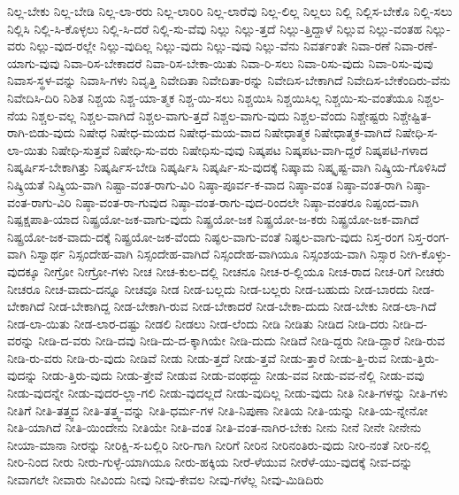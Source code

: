 {ನಿಲ್ಲ-ಬೇಕು
ನಿಲ್ಲ-ಬೇಡಿ
ನಿಲ್ಲ-ಲಾ-ರರು
ನಿಲ್ಲ-ಲಾರಿರಿ
ನಿಲ್ಲ-ಲಾರೆವು
ನಿಲ್ಲ-ಲಿಲ್ಲ
ನಿಲ್ಲಲು
ನಿಲ್ಲಿ
ನಿಲ್ಲಿಸ-ಬೇಕೊ
ನಿಲ್ಲಿ-ಸಲು
ನಿಲ್ಲಿಸಿ
ನಿಲ್ಲಿ-ಸಿ-ಕೊಳ್ಳಲು
ನಿಲ್ಲಿ-ಸಿ-ದರೆ
ನಿಲ್ಲಿ-ಸು-ವೆವು
ನಿಲ್ಲು
ನಿಲ್ಲು-ತ್ತದೆ
ನಿಲ್ಲು-ತ್ತಿದ್ದಾಳೆ
ನಿಲ್ಲುವ
ನಿಲ್ಲು-ವಂತಹ
ನಿಲ್ಲು-ವರು
ನಿಲ್ಲು-ವುದ-ರಲ್ಲೇ
ನಿಲ್ಲು-ವುದಿಲ್ಲ
ನಿಲ್ಲು-ವುದು
ನಿಲ್ಲು-ವುವು
ನಿಲ್ಲು-ವೆನು
ನಿವರ್ತಂತೇ
ನಿವಾ-ರಣೆ
ನಿವಾ-ರಣೆ-ಯಾಗು-ವುವು
ನಿವಾ-ರಿಸ-ಬೇಕಾದರೆ
ನಿವಾ-ರಿಸ-ಬೇಕಾ-ಯಿತು
ನಿವಾ-ರಿ-ಸಲು
ನಿವಾ-ರಿಸು-ವುದು
ನಿವಾ-ರಿಸು-ವುವು
ನಿವಾಸ-ಸ್ಥಳ-ವನ್ನು
ನಿವಾಸಿ-ಗಳು
ನಿವೃತ್ತಿ
ನಿವೇದಿತಾ
ನಿವೇದಿತಾ-ರನ್ನು
ನಿವೇದಿಸ-ಬೇಕಾಗಿದೆ
ನಿವೇದಿಸ-ಬೇಕೆಂದಿರು-ವೆನು
ನಿವೇದಿಸಿ-ದಿರಿ
ನಿಶಿತ
ನಿಶ್ಚಯ
ನಿಶ್ಚ-ಯಾ-ತ್ಮಕ
ನಿಶ್ಚ-ಯಿ-ಸಲು
ನಿಶ್ಚಯಿಸಿ
ನಿಶ್ಚಯಿಸಿಲ್ಲ
ನಿಶ್ಚಯಿ-ಸು-ವಂತೆಯೂ
ನಿಶ್ಚಲ-ನೆಯ
ನಿಶ್ಚಲ-ವಲ್ಲ
ನಿಶ್ಚಲ-ವಾಗಿದೆ
ನಿಶ್ಚಲ-ವಾಗು-ತ್ತದೆ
ನಿಶ್ಚಲ-ವಾಗು-ವುದು
ನಿಶ್ಚಲ-ವೆಂದು
ನಿಶ್ಚೇಷ್ಟರು
ನಿಶ್ಚೇಷ್ಟಿತ-ರಾಗಿ-ಬಿಡು-ವುದು
ನಿಷೇಧ
ನಿಷೇಧ-ಮಯದ
ನಿಷೇಧ-ಮಯ-ವಾದ
ನಿಷೇಧಾತ್ಮಕ
ನಿಷೇಧಾತ್ಮಕ-ವಾಗಿದೆ
ನಿಷೇಧಿ-ಸ-ಲಾ-ಯಿತು
ನಿಷೇಧಿ-ಸುತ್ತವೆ
ನಿಷೇಧಿ-ಸು-ವರು
ನಿಷೇಧಿಸು-ವುವು
ನಿಷ್ಕಪಟ
ನಿಷ್ಕಪಟ-ವಾಗಿ-ದ್ದರೆ
ನಿಷ್ಕಪಟಿ-ಗಳಾದ
ನಿಷ್ಕರ್ಷಿಸ-ಬೇಕಾಗಿತ್ತು
ನಿಷ್ಕರ್ಷಿಸ-ಬೇಡಿ
ನಿಷ್ಕರ್ಷಿಸಿ
ನಿಷ್ಕರ್ಷಿ-ಸು-ವುದಕ್ಕೆ
ನಿಷ್ಕಾಮ
ನಿಷ್ಕೃಷ್ಟ-ವಾಗಿ
ನಿಷ್ಕ್ರಿಯ-ಗೊಳಿಸಿದೆ
ನಿಷ್ಕ್ರಿಯತೆ
ನಿಷ್ಕ್ರಿಯ-ವಾಗಿ
ನಿಷ್ಟಾ-ವಂತ-ರಾಗು-ವಿರಿ
ನಿಷ್ಠಾ-ಪೂರ್ವ-ಕ-ವಾದ
ನಿಷ್ಠಾ-ವಂತ
ನಿಷ್ಠಾ-ವಂತ-ರಾಗಿ
ನಿಷ್ಠಾ-ವಂತ-ರಾಗು-ವಿರಿ
ನಿಷ್ಠಾ-ವಂತ-ರಾ-ಗುವುದ
ನಿಷ್ಠಾ-ವಂತ-ರಾಗು-ವುದ-ರಿಂದಲೇ
ನಿಷ್ಠಾ-ವಂತರೂ
ನಿಷ್ಪಂದ-ವಾಗಿ
ನಿಷ್ಪಕ್ಷಪಾತಿ-ಯಾದ
ನಿಷ್ಪ್ರಯೋ-ಜಕ-ವಾಗು-ವುದು
ನಿಷ್ಪ್ರಯೋ-ಜಕ
ನಿಷ್ಪ್ರಯೋ-ಜ-ಕರು
ನಿಷ್ಪ್ರಯೋ-ಜಕ-ವಾಗಿದೆ
ನಿಷ್ಪ್ರಯೋ-ಜಕ-ವಾದು-ದಕ್ಕೆ
ನಿಷ್ಪ್ರಯೋ-ಜಕ-ವೆಂದು
ನಿಷ್ಫಲ-ವಾಗು-ವಂತೆ
ನಿಷ್ಫಲ-ವಾಗು-ವುದು
ನಿಸ್ತ-ರಂಗ
ನಿಸ್ತ-ರಂಗ-ವಾಗಿ
ನಿಸ್ವಾರ್ಥ
ನಿಸ್ಸಂದೇಹ-ವಾಗಿ
ನಿಸ್ಸಂದೇಹ-ವಾಗಿದೆ
ನಿಸ್ಸಂದೇಹ-ವಾಗಿಯೂ
ನಿಸ್ಸಂಶಯ-ವಾಗಿ
ನಿಸ್ಸಾರ
ನೀಗಿ-ಕೊಳ್ಳು-ವುದಕ್ಕೂ
ನೀಗ್ರೋ
ನೀಗ್ರೋ-ಗಳು
ನೀಚ
ನೀಚ-ಕುಲ-ದಲ್ಲಿ
ನೀಚನೂ
ನೀಚ-ರ-ಲ್ಲಿಯೂ
ನೀಚ-ರಾದ
ನೀಚ-ರಿಗೆ
ನೀಚರು
ನೀಚರೂ
ನೀಚ-ವಾದು-ದನ್ನೂ
ನೀಚವೂ
ನೀಡ
ನೀಡ-ಬಲ್ಲದು
ನೀಡ-ಬಲ್ಲರು
ನೀಡ-ಬಹುದು
ನೀಡ-ಬಾರದು
ನೀಡ-ಬೇಕಾಗಿದೆ
ನೀಡ-ಬೇಕಾಗಿದ್ದ
ನೀಡ-ಬೇಕಾಗಿ-ರುವ
ನೀಡ-ಬೇಕಾದರೆ
ನೀಡ-ಬೇಕಾ-ದುದು
ನೀಡ-ಬೇಕು
ನೀಡ-ಲಾ-ಗಿದೆ
ನೀಡ-ಲಾ-ಯಿತು
ನೀಡ-ಲಾರ-ದಷ್ಟು
ನೀಡಲಿ
ನೀಡಲು
ನೀಡ-ಲೆಂದು
ನೀಡಿ
ನೀಡಿತು
ನೀಡಿದ
ನೀಡಿ-ದರು
ನೀಡಿ-ದ-ವರನ್ನು
ನೀಡಿ-ದ-ವರು
ನೀಡಿ-ದವು
ನೀಡಿ-ದು-ದ-ಕ್ಕಾಗಿಯೇ
ನೀಡಿ-ದುದು
ನೀಡಿದೆ
ನೀಡಿ-ದ್ದರು
ನೀಡಿ-ದ್ದಾರೆ
ನೀಡಿ-ರುವ
ನೀಡಿ-ರು-ವರು
ನೀಡಿ-ರು-ವುದು
ನೀಡಿವೆ
ನೀಡು
ನೀಡು-ತ್ತದೆ
ನೀಡು-ತ್ತವೆ
ನೀಡು-ತ್ತಾರೆ
ನೀಡು-ತ್ತಿ-ರುವ
ನೀಡು-ತ್ತಿರು-ವುದನ್ನು
ನೀಡು-ತ್ತಿರು-ವುದು
ನೀಡು-ತ್ತೇವೆ
ನೀಡುವ
ನೀಡು-ವಂಥದ್ದು
ನೀಡು-ವವ
ನೀಡು-ವವ-ನೆಲ್ಲಿ
ನೀಡು-ವವು
ನೀಡು-ವುದನ್ನೇ
ನೀಡು-ವುದರ-ಲ್ಲಾ-ಗಲಿ
ನೀಡು-ವುದಲ್ಲದೆ
ನೀಡು-ವುದಿಲ್ಲ
ನೀಡು-ವುದು
ನೀತಿ
ನೀತಿ-ಗಳನ್ನು
ನೀತಿ-ಗಳು
ನೀತಿಗೆ
ನೀತಿ-ತತ್ತ್ವದ
ನೀತಿ-ತತ್ತ್ವ-ವನ್ನು
ನೀತಿ-ಧರ್ಮ-ಗಳ
ನೀತಿ-ನಿಪುಣಾ
ನೀತಿಯ
ನೀತಿ-ಯನ್ನು
ನೀತಿ-ಯ-ನ್ನೇನೋ
ನೀತಿ-ಯಾಗಿದೆ
ನೀತಿ-ಯಿಂದೇನು
ನೀತಿಯೇ
ನೀತಿ-ವಂತ
ನೀತಿ-ವಂತ-ನಾಗಿರ-ಬೇಕು
ನೀನು
ನೀನೆ
ನೀನೇ
ನೀನೇನು
ನೀಯಾ-ಮಾನಾ
ನೀರನ್ನು
ನೀರಿಕ್ಷಿ-ಸ-ಬಲ್ಲಿರಿ
ನೀರಿ-ಗಾಗಿ
ನೀರಿಗೆ
ನೀರಿನ
ನೀರಿನಂತಿರು-ವುದು
ನೀರಿ-ನಂತೆ
ನೀರಿ-ನಲ್ಲಿ
ನೀರಿ-ನಿಂದ
ನೀರು
ನೀರು-ಗುಳ್ಳೆ-ಯಾಗಿಯೂ
ನೀರು-ಹಕ್ಕಿಯ
ನೀರೆ-ಳೆಯುವ
ನೀರೆಳೆ-ಯು-ವುದಕ್ಕೆ
ನೀವ-ದನ್ನು
ನೀವಾಗಲೇ
ನೀವಾರು
ನೀವಿಂದು
ನೀವು
ನೀವು-ಕೇವಲ
ನೀವು-ಗಳೆಲ್ಲ
ನೀವು-ಮಿಡಿದಿರು
}
